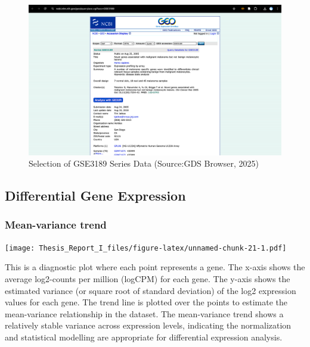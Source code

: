 \documentclass[
]{article}
\begin{document}
\begin{figure}

{\centering \includegraphics[width=0.9\linewidth]{Images/Gene_Expression_Omnibus2025-06-18 at 10.07.49} 

}

\caption{Selection of GSE3189 Series Data (Source:GDS Browser, 2025)}\label{fig:unnamed-chunk-15}
\end{figure}
\newpage

\newpage

\subsection{Differential Gene
Expression}\label{differential-gene-expression}

\subsubsection{Mean-variance trend}\label{mean-variance-trend}

\texttt{[image: Thesis\_Report\_I\_files/figure-latex/unnamed-chunk-21-1.pdf]}

This is a diagnostic plot where each point represents a gene. The x-axis
shows the average log2-counts per million (logCPM) for each gene. The
y-axis shows the estimated variance (or square root of standard
deviation) of the log2 expression values for each gene. The trend line
is plotted over the points to estimate the mean-variance relationship in
the dataset. The mean-variance trend shows a relatively stable variance
across expression levels, indicating the normalization and statistical
modelling are appropriate for differential expression analysis.

\newpage
\end{document}
